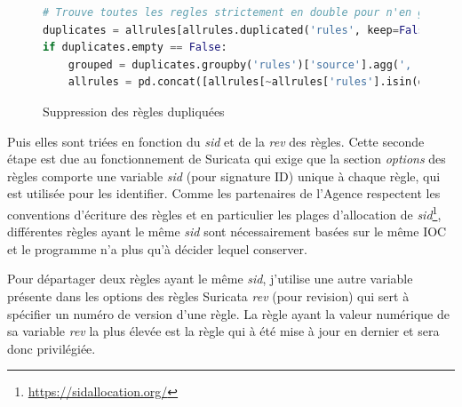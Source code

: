 \begin{figure}[h]%
    \center%
\begin{lstlisting}[language=Python]
# Trouve toutes les regles strictement en double pour n'en garder qu'une
duplicates = allrules[allrules.duplicated('rules', keep=False)]
if duplicates.empty == False:
    grouped = duplicates.groupby('rules')['source'].agg(', '.join).reset_index()
    allrules = pd.concat([allrules[~allrules['rules'].isin(duplicates['rules'])], grouped], ignore_index=True)
\end{lstlisting}
    \caption[Suppression des règles dupliquées]{Suppression des règles dupliquées}\label{fig:DeleteRules}
\end{figure}

\vspace{1em}

Puis elles sont triées en fonction du \textit{sid} et de la \textit{rev} des règles.
Cette seconde étape est due au fonctionnement de Suricata qui exige que la section \textit{options} des règles comporte une variable \textit{sid} (pour signature ID) unique à chaque règle, qui est utilisée pour les identifier. Comme les partenaires de l'Agence respectent les conventions d'écriture des règles et en particulier les plages d'allocation de \textit{sid}\footnote{\url{https://sidallocation.org/}}, différentes règles ayant le même \textit{sid} sont nécessairement basées sur le même IOC et le programme n'a plus qu'à décider lequel conserver.\\

\newpage

Pour départager deux règles ayant le même \textit{sid}, j'utilise une autre variable présente dans les options des règles Suricata \textit{rev} (pour revision) qui sert à spécifier un numéro de version d'une règle. La règle ayant la valeur numérique de sa variable \textit{rev} la plus élevée est la règle qui à été mise à jour en dernier et sera donc privilégiée.\\

\vspace{0.5em}

